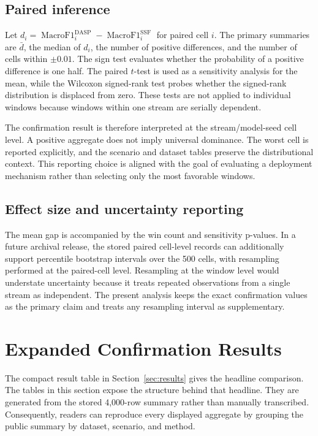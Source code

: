 \subsection{Paired inference}
Let $d_i=\operatorname{MacroF1}_{i}^{\mathrm{DASP}}-\operatorname{MacroF1}_{i}^{\mathrm{SSF}}$ for paired cell $i$. The primary summaries are $\bar d$, the median of $d_i$, the number of positive differences, and the number of cells within $\pm0.01$. The sign test evaluates whether the probability of a positive difference is one half. The paired $t$-test is used as a sensitivity analysis for the mean, while the Wilcoxon signed-rank test probes whether the signed-rank distribution is displaced from zero. These tests are not applied to individual windows because windows within one stream are serially dependent.

The confirmation result is therefore interpreted at the stream/model-seed cell level. A positive aggregate does not imply universal dominance. The worst cell is reported explicitly, and the scenario and dataset tables preserve the distributional context. This reporting choice is aligned with the goal of evaluating a deployment mechanism rather than selecting only the most favorable windows.

\subsection{Effect size and uncertainty reporting}
The mean gap is accompanied by the win count and sensitivity p-values. In a future archival release, the stored paired cell-level records can additionally support percentile bootstrap intervals over the 500 cells, with resampling performed at the paired-cell level. Resampling at the window level would understate uncertainty because it treats repeated observations from a single stream as independent. The present analysis keeps the exact confirmation values as the primary claim and treats any resampling interval as supplementary.

\section{Expanded Confirmation Results}
\label{sec:expanded-results}

The compact result table in Section~\ref{sec:results} gives the headline comparison. The tables in this section expose the structure behind that headline. They are generated from the stored 4,000-row summary rather than manually transcribed. Consequently, readers can reproduce every displayed aggregate by grouping the public summary by dataset, scenario, and method.

